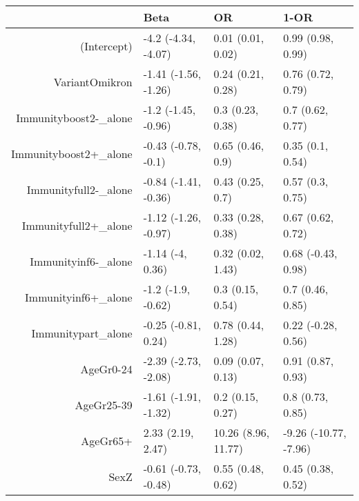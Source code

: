 \begin{table}[ht]
\centering
\begin{tabular}{rlll}
  \hline
 & Beta & OR & 1-OR \\ 
  \hline
(Intercept) & -4.2 (-4.34, -4.07) & 0.01 (0.01, 0.02) & 0.99 (0.98, 0.99) \\ 
  VariantOmikron & -1.41 (-1.56, -1.26) & 0.24 (0.21, 0.28) & 0.76 (0.72, 0.79) \\ 
  Immunityboost2-\_alone & -1.2 (-1.45, -0.96) & 0.3 (0.23, 0.38) & 0.7 (0.62, 0.77) \\ 
  Immunityboost2+\_alone & -0.43 (-0.78, -0.1) & 0.65 (0.46, 0.9) & 0.35 (0.1, 0.54) \\ 
  Immunityfull2-\_alone & -0.84 (-1.41, -0.36) & 0.43 (0.25, 0.7) & 0.57 (0.3, 0.75) \\ 
  Immunityfull2+\_alone & -1.12 (-1.26, -0.97) & 0.33 (0.28, 0.38) & 0.67 (0.62, 0.72) \\ 
  Immunityinf6-\_alone & -1.14 (-4, 0.36) & 0.32 (0.02, 1.43) & 0.68 (-0.43, 0.98) \\ 
  Immunityinf6+\_alone & -1.2 (-1.9, -0.62) & 0.3 (0.15, 0.54) & 0.7 (0.46, 0.85) \\ 
  Immunitypart\_alone & -0.25 (-0.81, 0.24) & 0.78 (0.44, 1.28) & 0.22 (-0.28, 0.56) \\ 
  AgeGr0-24 & -2.39 (-2.73, -2.08) & 0.09 (0.07, 0.13) & 0.91 (0.87, 0.93) \\ 
  AgeGr25-39 & -1.61 (-1.91, -1.32) & 0.2 (0.15, 0.27) & 0.8 (0.73, 0.85) \\ 
  AgeGr65+ & 2.33 (2.19, 2.47) & 10.26 (8.96, 11.77) & -9.26 (-10.77, -7.96) \\ 
  SexZ & -0.61 (-0.73, -0.48) & 0.55 (0.48, 0.62) & 0.45 (0.38, 0.52) \\ 
   \hline
\end{tabular}
\end{table}
